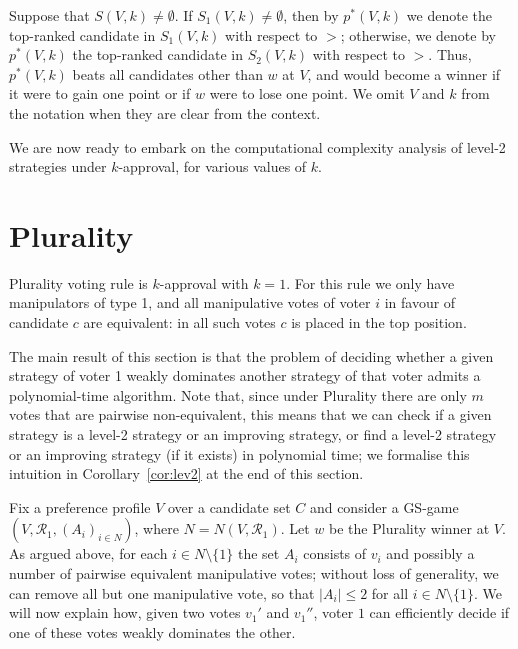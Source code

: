 \documentclass[11pt]{article}
\newcommand{\calR}{\mathcal{R}}
\begin{document}
Suppose that $S(V, k)\neq\emptyset$.
If $S_1(V,k)\ne \emptyset$, then by $p^*(V, k)$ we denote the top-ranked candidate in $S_1(V,k)$ with respect to $>$;
otherwise, we denote by $p^*(V, k)$ the top-ranked candidate in $S_2(V,k)$ with respect to $>$.
Thus, $p^*(V, k)$ beats all candidates other than $w$ at $V$, and would become a winner
if it were to gain one point or if $w$ were to lose one point.
We omit $V$ and $k$ from the notation when they are clear from the context.

We are now ready to embark on the computational complexity analysis of level-2 strategies 
under $k$-approval, for various values of $k$.

\section{Plurality}\label{sec:plu}
Plurality voting rule is $k$-approval with $k=1$. 
For this rule we only have manipulators of type 1, and
all manipulative votes of voter $i$ in favour of candidate $c$
are equivalent: in all such votes $c$ is placed in the top position. 

The main result of this section is that the problem of deciding whether a given strategy 
of voter 1 weakly dominates another strategy of that voter admits a polynomial-time algorithm. Note that, 
since under Plurality there are only $m$ votes that are pairwise non-equivalent, 
this means that we can check if a given strategy is a level-2 strategy or an improving strategy, or
find a level-2 strategy or an improving strategy (if it exists) in polynomial time; we formalise this intuition in 
Corollary~\ref{cor:lev2} at the end of this section.

Fix a preference profile $V$ over a candidate set $C$ and consider a GS-game 
$(V, \calR_1, (A_i)_{i\in N})$, where $N=N(V, \calR_1)$. Let $w$ be the Plurality winner at $V$. 
As argued above, for each $i\in N\setminus\{1\}$ the set $A_i$ consists of $v_i$ and possibly a number of pairwise
equivalent manipulative votes; without loss of generality, we can remove
all but one manipulative vote, so that $|A_i|\le 2$ for all $i\in N\setminus\{1\}$.
We will now explain how, given two votes $v_1'$ and $v_1''$, voter $1$ 
can efficiently decide if one of these votes weakly dominates the other.
\end{document}
